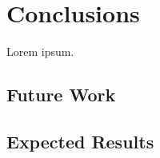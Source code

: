 \chapter{Conclusions}
\label{chap:conclusions}


Lorem ipsum.

\section{Future Work}

\section{Expected Results}